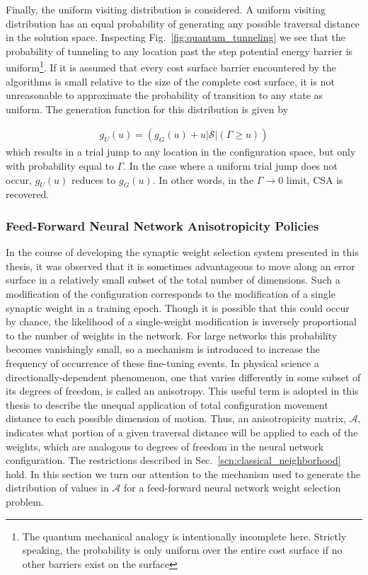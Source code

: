 \documentclass[11pt]{afthesis}
\begin{document}
	
	Finally, the uniform visiting distribution is considered. A uniform visiting distribution has an equal probability of generating any possible traversal distance in the solution space. Inspecting Fig.~\ref{fig:quantum_tunneling} we see that the probability of tunneling to any location past the step potential energy barrier is uniform\footnote{The quantum mechanical analogy is intentionally incomplete here. Strictly speaking, the probability is only uniform over the entire cost surface if no other barriers exist on the surface}. If it is assumed that every cost surface barrier encountered by the algorithms is small relative to the size of the complete cost surface, it is not unreasonable to approximate the probability of transition to any state as uniform. The generation function for this distribution is given by
	
	\begin{align}\label{eq:uniform_generation_fcn}
	g_{U}(u) = (g_{G}(u) +  u \left| \boldsymbol{\mathcal{S}} \right| (\Gamma\geq u))
	\end{align}
	\noindent which results in a trial jump to any location in the configuration space, but only with probability equal to $\Gamma$. In the case where a uniform trial jump does not occur, $g_{U}(u)$ reduces to $g_{G}(u)$. In other words, in the $\Gamma \rightarrow 0$ limit, CSA is recovered.
	
	\subsubsection{Feed-Forward Neural Network Anisotropicity Policies}
	\label{scn:ffnn_anisotropicity}
	In the course of developing the synaptic weight selection system presented in this thesis, it was observed that it is sometimes advantageous to move along an error surface in a relatively small subset of the total number of dimensions. Such a modification of the configuration corresponds to the modification of a single synaptic weight in a training epoch. Though it is possible that this could occur by chance, the likelihood of a single-weight modification is inversely proportional to the number of weights in the network. For large networks this probability becomes vanishingly small, so a mechanism is introduced to increase the frequency of occurrence of these fine-tuning events. In physical science a directionally-dependent phenomenon, one that varies differently in some subset of its degrees of freedom, is called an anisotropy. This useful term is adopted in this thesis to describe the unequal application of total configuration movement distance to each possible dimension of motion. Thus, an anisotropicity matrix, $\boldsymbol{\mathcal{A}}$,  indicates what portion of a given traversal distance will be applied to each of the weights, which are analogous to degrees of freedom in the neural network configuration. The restrictions described in Sec.~\ref{scn:classical_neighborhood} hold. In this section we turn our attention to the mechanism used to generate the distribution of values in $\boldsymbol{\mathcal{A}}$ for a feed-forward neural network weight selection problem. 
	
\end{document}

